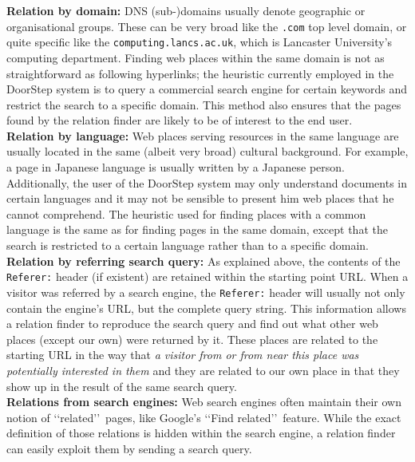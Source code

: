 \documentclass[a4paper]{danarticle}
\theoremstyle{remark}
\begin{document}
    \textbf{Relation by domain:} DNS (sub-)domains usually denote geographic or 
    organisational groups. These can be very broad like the \verb$.com$ top 
    level domain, or quite specific like the \verb$computing.lancs.ac.uk$, 
    which is Lancaster University's computing department. 
    Finding web places within the same domain is not as 
    straightforward as following hyperlinks; the heuristic currently employed 
    in the DoorStep system is to query a commercial search engine for certain 
    keywords and restrict the search to a specific domain. This method also 
    ensures that the pages found by the relation finder are likely to be 
    of interest to the end user.
    \\
    
    \textbf{Relation by language:} Web places serving resources in the same 
    language are usually located in the same (albeit very broad) cultural background. 
    For example, a page in Japanese language is usually written by a Japanese 
    person. Additionally, the user of the DoorStep system may only understand 
    documents in certain languages and it may not be sensible to present him web 
    places that he cannot comprehend. The heuristic used for finding places with 
    a common language is the same as for finding pages in the same domain,
    except that the search is restricted to a certain language rather than to a
    specific domain.
    \\
    
    \textbf{Relation by referring search query:} As explained above, the 
    contents of the \verb$Referer:$ header (if existent) are retained within the 
    starting point URL. When a visitor was referred by a search 
    engine, the \verb$Referer:$ header will usually not only contain the 
    engine's URL, but the complete query string. This information allows a 
    relation finder to reproduce the search query and find out what other web 
    places (except our own) were returned by it. These places are related to the 
    starting URL in the way that \textit{a visitor from or from near this place was 
    potentially interested in them} and they are related to our own place in
    that they show up in the result of the same search query.
    \\
    
    \textbf{Relations from search engines:} Web search engines often maintain 
    their own notion of \lq\lq related\rq\rq\ pages, like Google's 
    \lq\lq Find related\rq\rq\ feature. While the exact definition of those 
    relations is hidden within the search engine, a relation finder can 
    easily exploit them by sending a search query.
    \\
    
\end{document}
